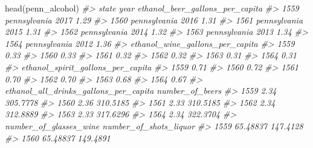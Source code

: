 \documentclass[
]{krantz}
\makeatletter
\newenvironment{Shaded}{\begin{snugshade}}{\end{snugshade}}
\newcommand{\CommentTok}[1]{\textcolor[rgb]{0.37,0.37,0.37}{\textit{#1}}}
\newcommand{\FunctionTok}[1]{\textcolor[rgb]{0,0,0}{#1}}
\newcommand{\NormalTok}[1]{#1}
\newenvironment{kframe}{%
\medskip{}
\setlength{\fboxsep}{.8em}
 \def\at@end@of@kframe{}%
 \ifinner\ifhmode%
  \def\at@end@of@kframe{\end{minipage}}%
  \begin{minipage}{\columnwidth}%
 \fi\fi%
 \def\FrameCommand##1{\hskip\@totalleftmargin \hskip-\fboxsep
 \colorbox{shadecolor}{##1}\hskip-\fboxsep
     \hskip-\linewidth \hskip-\@totalleftmargin \hskip\columnwidth}%
 \MakeFramed {\advance\hsize-\width
   \@totalleftmargin\z@ \linewidth\hsize
   \@setminipage}}%
 {\par\unskip\endMakeFramed%
 \at@end@of@kframe}
\renewenvironment{Shaded}{\begin{kframe}}{\end{kframe}}
\makeatother
\begin{document}
\begin{Shaded}
\begin{Highlighting}[]
\FunctionTok{head}\NormalTok{(penn\_alcohol)}
\CommentTok{\#\textgreater{}             state year ethanol\_beer\_gallons\_per\_capita}
\CommentTok{\#\textgreater{} 1559 pennsylvania 2017                            1.29}
\CommentTok{\#\textgreater{} 1560 pennsylvania 2016                            1.31}
\CommentTok{\#\textgreater{} 1561 pennsylvania 2015                            1.31}
\CommentTok{\#\textgreater{} 1562 pennsylvania 2014                            1.32}
\CommentTok{\#\textgreater{} 1563 pennsylvania 2013                            1.34}
\CommentTok{\#\textgreater{} 1564 pennsylvania 2012                            1.36}
\CommentTok{\#\textgreater{}      ethanol\_wine\_gallons\_per\_capita}
\CommentTok{\#\textgreater{} 1559                            0.33}
\CommentTok{\#\textgreater{} 1560                            0.33}
\CommentTok{\#\textgreater{} 1561                            0.32}
\CommentTok{\#\textgreater{} 1562                            0.32}
\CommentTok{\#\textgreater{} 1563                            0.31}
\CommentTok{\#\textgreater{} 1564                            0.31}
\CommentTok{\#\textgreater{}      ethanol\_spirit\_gallons\_per\_capita}
\CommentTok{\#\textgreater{} 1559                              0.71}
\CommentTok{\#\textgreater{} 1560                              0.72}
\CommentTok{\#\textgreater{} 1561                              0.70}
\CommentTok{\#\textgreater{} 1562                              0.70}
\CommentTok{\#\textgreater{} 1563                              0.68}
\CommentTok{\#\textgreater{} 1564                              0.67}
\CommentTok{\#\textgreater{}      ethanol\_all\_drinks\_gallons\_per\_capita number\_of\_beers}
\CommentTok{\#\textgreater{} 1559                                  2.34        305.7778}
\CommentTok{\#\textgreater{} 1560                                  2.36        310.5185}
\CommentTok{\#\textgreater{} 1561                                  2.33        310.5185}
\CommentTok{\#\textgreater{} 1562                                  2.34        312.8889}
\CommentTok{\#\textgreater{} 1563                                  2.33        317.6296}
\CommentTok{\#\textgreater{} 1564                                  2.34        322.3704}
\CommentTok{\#\textgreater{}      number\_of\_glasses\_wine number\_of\_shots\_liquor}
\CommentTok{\#\textgreater{} 1559               65.48837               147.4128}
\CommentTok{\#\textgreater{} 1560               65.48837               149.4891}

\end{Highlighting}
\end{Shaded}
\end{document}
